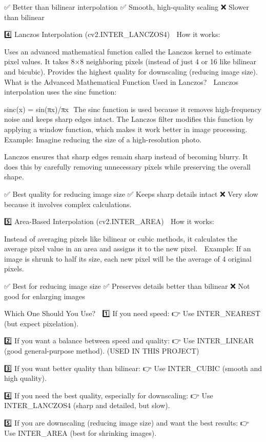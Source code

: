 ✅ Better than bilinear interpolation
✅ Smooth, high-quality scaling
❌ Slower than bilinear

4️⃣ Lanczos Interpolation (cv2.INTER_LANCZOS4)
📌 How it works:

Uses an advanced mathematical function called the Lanczos kernel to estimate pixel values.
It takes 8×8 neighboring pixels (instead of just 4 or 16 like bilinear and bicubic).
Provides the highest quality for downscaling (reducing image size).
What is the Advanced Mathematical Function Used in Lanczos? 🤔
Lanczos interpolation uses the sinc function:

sinc(x) = sin(πx)/πx
​
The sinc function is used because it removes high-frequency noise and keeps sharp edges intact.
The Lanczos filter modifies this function by applying a window function, which makes it work better in image processing.
🔹 Example:
Imagine reducing the size of a high-resolution photo.

Lanczos ensures that sharp edges remain sharp instead of becoming blurry.
It does this by carefully removing unnecessary pixels while preserving the overall shape.

✅ Best quality for reducing image size
✅ Keeps sharp details intact
❌ Very slow because it involves complex calculations.

5️⃣ Area-Based Interpolation (cv2.INTER_AREA)
📌 How it works:

Instead of averaging pixels like bilinear or cubic methods, it calculates the average pixel value in an area and assigns it to the new pixel.
🔹 Example:
If an image is shrunk to half its size, each new pixel will be the average of 4 original pixels.

✅ Best for reducing image size
✅ Preserves details better than bilinear
❌ Not good for enlarging images

Which One Should You Use? 🤔
1️⃣ If you need speed:
👉 Use INTER_NEAREST (but expect pixelation).

2️⃣ If you want a balance between speed and quality:
👉 Use INTER_LINEAR (good general-purpose method). (USED IN THIS PROJECT)

3️⃣ If you want better quality than bilinear:
👉 Use INTER_CUBIC (smooth and high quality).

4️⃣ If you need the best quality, especially for downscaling:
👉 Use INTER_LANCZOS4 (sharp and detailed, but slow).

5️⃣ If you are downscaling (reducing image size) and want the best results:
👉 Use INTER_AREA (best for shrinking images).

